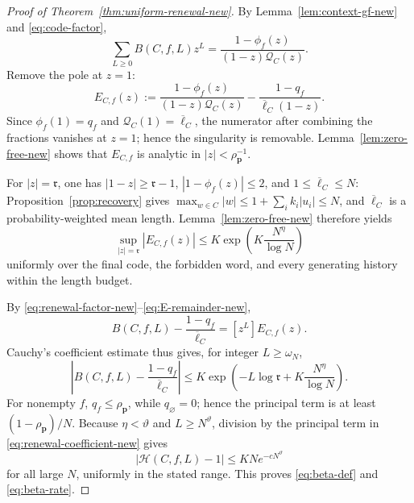\documentclass[journal]{IEEEtran}
\theoremstyle{plain}
\theoremstyle{definition}
\theoremstyle{remark}
\newcommand{\rhoP}{\rho_{\mathbf p}}
\newcommand{\lbar}{\overline\ell}
\begin{document}
\begin{proof}[Proof of Theorem~\ref{thm:uniform-renewal-new}]
By Lemma~\ref{lem:context-gf-new} and \eqref{eq:code-factor},
\begin{equation}\label{eq:renewal-factor-new}
 \sum_{L\ge0}B(C,f,L)z^L
 =\frac{1-\phi_f(z)}{(1-z)\mathcal Q_C(z)}.
\end{equation}
Remove the pole at $z=1$:
\begin{equation}\label{eq:E-remainder-new}
 E_{C,f}(z):=
 \frac{1-\phi_f(z)}{(1-z)\mathcal Q_C(z)}
 -\frac{1-q_f}{\lbar_C(1-z)}.
\end{equation}
Since $\phi_f(1)=q_f$ and $\mathcal Q_C(1)=\lbar_C$, the numerator after combining the fractions vanishes at $z=1$; hence the singularity is removable.  Lemma~\ref{lem:zero-free-new} shows that $E_{C,f}$ is analytic in $|z|<\rhoP^{-1}$.

For $|z|=\mathfrak r$, one has $|1-z|\ge\mathfrak r-1$, $|1-\phi_f(z)|\le2$, and $1\le\lbar_C\le N$: Proposition~\ref{prop:recovery} gives $\max_{w\in C}|w|\le1+\sum_i k_i|u_i|\le N$, and $\lbar_C$ is a probability-weighted mean length.  Lemma~\ref{lem:zero-free-new} therefore yields
\begin{equation}\label{eq:E-sup-new}
 \sup_{|z|=\mathfrak r}|E_{C,f}(z)|
 \le K\exp\left(K\frac{N^\eta}{\log N}\right)
\end{equation}
uniformly over the final code, the forbidden word, and every generating history within the length budget.

By \eqref{eq:renewal-factor-new}--\eqref{eq:E-remainder-new},
\begin{equation*}
 B(C,f,L)-\frac{1-q_f}{\lbar_C}=[z^L]E_{C,f}(z).
\end{equation*}
Cauchy's coefficient estimate thus gives, for integer $L\ge\omega_N$,
\begin{equation}\label{eq:renewal-coefficient-new}
 \left|B(C,f,L)-\frac{1-q_f}{\lbar_C}\right|
 \le K\exp\left(-L\log\mathfrak r
                 +K\frac{N^\eta}{\log N}\right).
\end{equation}
For nonempty $f$, $q_f\le\rhoP$, while $q_\varnothing=0$; hence the principal term is at least $(1-\rhoP)/N$.  Because $\eta<\vartheta$ and $L\ge N^\vartheta$, division by the principal term in \eqref{eq:renewal-coefficient-new} gives
\begin{equation*}
 |\mathcal H(C,f,L)-1|\le KN e^{-cN^\vartheta}
\end{equation*}
for all large $N$, uniformly in the stated range.  This proves \eqref{eq:beta-def} and \eqref{eq:beta-rate}.
\end{proof}
\end{document}
